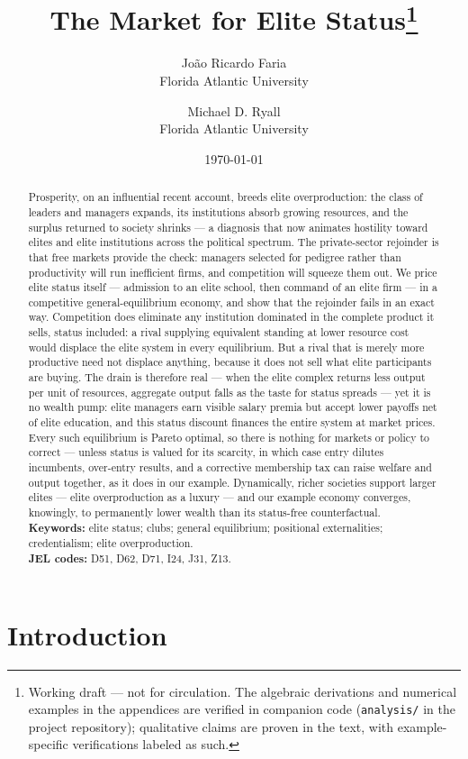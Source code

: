 \documentclass[12pt,letterpaper]{article}
\title{The Market for Elite Status\thanks{Working draft --- not for circulation.
The algebraic derivations and numerical examples in the appendices are verified in companion code (\texttt{analysis/} in the project repository); qualitative claims are proven in the text, with example-specific verifications labeled as such.}}
\author{Jo\~{a}o Ricardo Faria\\ Florida Atlantic University
  \and Michael D. Ryall\\ Florida Atlantic University}
\date{\today}
\theoremstyle{definition}
\begin{document}
\maketitle

\begin{abstract}
\noindent Prosperity, on an influential recent account, breeds elite overproduction: the class of leaders and managers expands, its institutions absorb growing resources, and the surplus returned to society shrinks --- a diagnosis that now animates hostility toward elites and elite institutions across the political spectrum.
The private-sector rejoinder is that free markets provide the check: managers selected for pedigree rather than productivity will run inefficient firms, and competition will squeeze them out.
We price elite status itself --- admission to an elite school, then command of an elite firm --- in a competitive general-equilibrium economy, and show that the rejoinder fails in an exact way.
Competition does eliminate any institution dominated in the complete product it sells, status included: a rival supplying equivalent standing at lower resource cost would displace the elite system in every equilibrium.
But a rival that is merely more productive need not displace anything, because it does not sell what elite participants are buying.
The drain is therefore real --- when the elite complex returns less output per unit of resources, aggregate output falls as the taste for status spreads --- yet it is no wealth pump: elite managers earn visible salary premia but accept lower payoffs net of elite education, and this status discount finances the entire system at market prices.
Every such equilibrium is Pareto optimal, so there is nothing for markets or policy to correct --- unless status is valued for its scarcity, in which case entry dilutes incumbents, over-entry results, and a corrective membership tax can raise welfare and output together, as it does in our example.
Dynamically, richer societies support larger elites --- elite overproduction as a luxury --- and our example economy converges, knowingly, to permanently lower wealth than its status-free counterfactual.
\medskip
\noindent\textbf{Keywords:} elite status; clubs; general equilibrium; positional externalities; credentialism; elite overproduction.\\
\textbf{JEL codes:} D51, D62, D71, I24, J31, Z13.
\end{abstract}

\onehalfspacing

\section{Introduction}\label{sec:intro}
\end{document}
